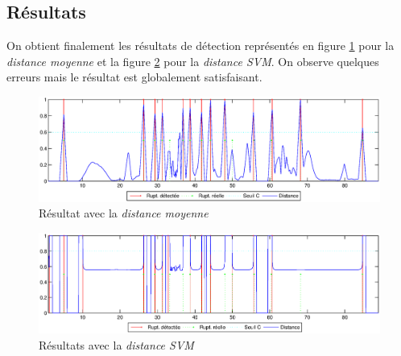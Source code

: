 
\subsection{Résultats}

On obtient finalement les résultats de détection représentés en figure \ref{resMoy} pour la \textit{distance moyenne} et la figure \ref{resSVM} pour la \textit{distance SVM}. On observe quelques erreurs mais le résultat est globalement satisfaisant.


\begin{figure}
\centering
\includegraphics[width=\textwidth]{images/resultatMoy}
\caption{Résultat avec la \textit{distance moyenne}}
\label{resMoy}
\end{figure}


\begin{figure}
\centering
\includegraphics[width=\textwidth]{images/resultatSVM}
\caption{Résultats avec la \textit{distance SVM}}
\label{resSVM}
\end{figure}

\nocite{Loosli05}
